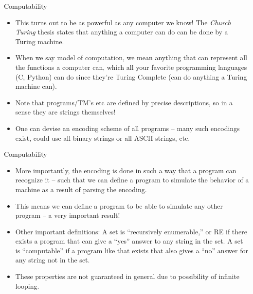 \documentclass[aspectratio=169]{beamer}
\begin{document}
\begin{frame}{Computability}
  
  \begin{itemize}
    \item This turns out to be as powerful as any computer we know! The \emph{Church Turing} thesis states that anything a computer can do can be done by a Turing machine. \pause
    \item When we say model of computation, we mean anything that can represent all the functions a computer can, which all your favorite programming languages (C, Python) can do since they're Turing Complete (can do anything a Turing machine can). \pause
    \item Note that programs/TM's etc are defined by precise descriptions, so in a sense they are strings themselves! \pause
    \item One can devise an encoding scheme of all programs -- many such encodings exist, could use all binary strings or all ASCII strings, etc.
  \end{itemize}
\end{frame}

\begin{frame}{Computability}
  
  \begin{itemize}
    \item More importantly, the encoding is done in such a way that a program can recognize it -- such that we can define a program to simulate the behavior of a machine as a result of parsing the encoding. \pause
    \item This means we can define a program to be able to simulate any other program -- a very important result! \pause
    \item Other important definitions: A set is ``recursively enumerable,'' or RE if there exists a program that can give a ``yes'' answer to any string in the set. A set is ``computable'' if a program like that exists that also gives a ``no'' answer for any string not in the set. \pause
    \item These properties are not guaranteed in general due to possibility of infinite looping.
  \end{itemize}
\end{frame}
\end{document}
